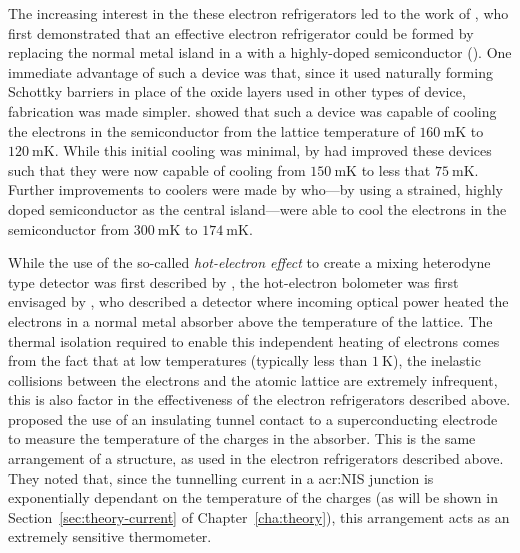 The increasing interest in the these electron refrigerators led to the work of \textcite{Savin2001}, who first demonstrated that an effective electron refrigerator could be formed by replacing the normal metal island in a  with a highly-doped semiconductor (). One immediate advantage of such a device was that, since it used naturally forming Schottky barriers in place of the oxide layers used in other types of device, fabrication was made simpler. \citeauthor{Savin2001} showed that such a device was capable of cooling the electrons in the semiconductor from the lattice temperature of $160~\mathrm{mK}$ to $120~\mathrm{mK}$. While this initial cooling was minimal, by \citeyear{Savin2003} \citeauthor{Savin2003} had improved these devices such that they were now capable of cooling from $150~\mathrm{mK}$ to less that $75~\mathrm{mK}$. Further improvements to  coolers were made by \cite{Prest2011} who---by using a strained, highly doped semiconductor as the central island---were able to cool the electrons in the semiconductor from $300~\mathrm{mK}$ to $174~\mathrm{mK}$.
\par 
While the use of the so-called \textit{hot-electron effect} to create a mixing heterodyne type detector was first described by \textcite{Arams1996}, the hot-electron bolometer was first envisaged by \textcite{Nahum1993}, who described a detector where incoming optical power heated the electrons in a normal metal absorber above the temperature of the lattice. The thermal isolation required to enable this independent heating of electrons comes from the fact that at low temperatures (typically less than $1~\mathrm{K}$), the inelastic collisions between the electrons and the atomic lattice are extremely infrequent, this is also factor in the effectiveness of the electron refrigerators described above.  proposed the use of an insulating tunnel contact to a superconducting electrode to measure the temperature of the charges in the absorber. This is the same arrangement of a  structure, as used in the electron refrigerators described above. They noted that, since the tunnelling current in a \gls{acr:NIS} junction is exponentially dependant on the temperature of the charges (as will be shown in Section~\ref{sec:theory-current} of Chapter~\ref{cha:theory}), this arrangement acts as an extremely sensitive thermometer.
\par 
